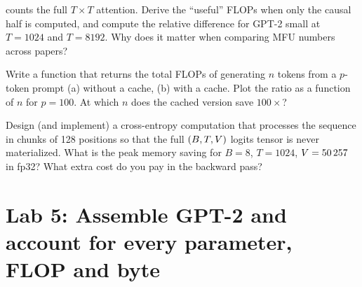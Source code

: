 \begin{exercise}
 counts the full $T\times T$ attention. Derive the ``useful'' FLOPs when only the
causal half is computed, and compute the relative difference for GPT-2 small at $T=1024$ and
$T=8192$. Why does it matter when comparing MFU numbers across papers?
\end{exercise}

\begin{exercise}
Write a function that returns the total FLOPs of generating $n$ tokens from a $p$-token prompt
(a) without a cache, (b) with a cache. Plot the ratio as a function of $n$ for $p=100$. At which
$n$ does the cached version save $100\times$?
\end{exercise}

\begin{exercise}
Design (and implement) a cross-entropy computation that processes the sequence in chunks of 128
positions so that the full $(B,T,V)$ logits tensor is never materialized. What is the peak
memory saving for $B=8$, $T=1024$, $V=\num{50257}$ in fp32? What extra cost do you pay in the
backward pass?
\end{exercise}

\section{Lab 5: Assemble GPT-2 and account for every parameter, FLOP and byte}\label{sec:gpt:lab}

